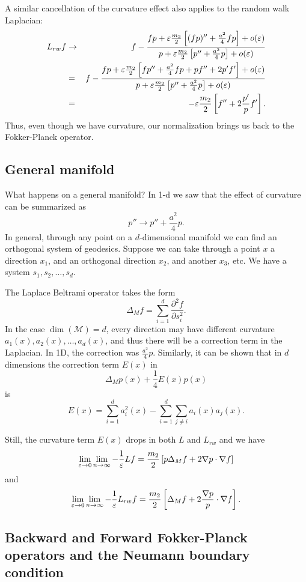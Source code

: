 A similar cancellation of the curvature effect also applies to the random walk Laplacian:
\begin{eqnarray*}
L_{rw}f &\to& f - \frac{fp + \varepsilon \frac{m_2}{2}\left[(fp)'' + \frac{a^2}{4}fp \right] + o(\varepsilon)}{p + \varepsilon \frac{m_2}{2}\left[p'' + \frac{a^2}{4}p \right] + o(\varepsilon)} \\
&=& f - \frac{fp + \varepsilon \frac{m_2}{2}\left[fp'' + \frac{a^2}{4}fp + pf'' + 2p'f'  \right] + o(\varepsilon)}{p + \varepsilon \frac{m_2}{2}\left[p'' + \frac{a^2}{4}p \right] + o(\varepsilon)} \\
&=& -\varepsilon\frac{m_2}{2}\left[f'' + 2\frac{p'}{p}f' \right].
\end{eqnarray*}
Thus, even though we have curvature, our normalization brings us back to the Fokker-Planck operator.

\subsection{General manifold}
What happens on a general manifold?
In 1-d we saw that the effect of curvature can be summarized as $$p'' \to p'' + \frac{a^2}{4} p.$$
In general, through any point on a $d$-dimensional manifold we can find an orthogonal system of geodesics.
Suppose we can take through a point $x$ a direction $x_1$, and an orthogonal direction $x_2$, and another $x_3$, etc.
We have a system $s_1, s_2, \ldots, s_d$.

The Laplace Beltrami operator takes the form
$$
\Delta_M f = \sum_{i=1}^d \frac{\partial^2 f}{ \partial s_i^2}.
$$
In the case $\operatorname{dim}(\mathcal{M}) = d$, every direction may have different curvature $a_1(x), a_2(x), \ldots, a_d(x)$, and thus there will be a correction term in the Laplacian.
In 1D, the correction was $\frac{a^2}{4}p$.
Similarly, it can be shown that in $d$ dimensions the correction term $E(x)$ in $$\Delta_M p(x) + \frac{1}{4}E(x)p(x)$$ is
$$
E(x) = \sum_{i=1}^da_i^2(x) - \sum_{i=1}^d\sum_{j\neq i}a_i(x)a_j(x).
$$

Still, the curvature term $E(x)$ drops in both $L$ and $L_{rw}$ and we have
$$\lim_{\varepsilon\to 0} \lim_{n\to \infty} -\frac{1}{\varepsilon}Lf = \frac{m_2}{2} \left[p \Delta_M f + 2\nabla p \cdot \nabla f \right]$$
and
$$\lim_{\varepsilon\to 0} \lim_{n\to \infty} -\frac{1}{\varepsilon}L_{rw}f = \frac{m_2}{2} \left[\Delta_M f + 2\frac{\nabla p}{p} \cdot \nabla f \right].$$

\subsection{Backward and Forward Fokker-Planck operators and the Neumann boundary condition}

